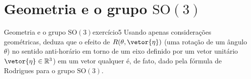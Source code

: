 \section[Geometria e o grupo SO(3)]{Geometria e o grupo \(\mathrm{SO}(3)\)}
\begin{exercício}{Geometria e o grupo \(\mathrm{SO}(3)\)}{exercício5}
    Usando apenas considerações geométricas, deduza que o efeito de \(R(\theta, \vetor{\eta})\) (uma rotação de um ângulo \(\theta\)) no sentido anti-horário em torno de um eixo definido por um vetor unitário \(\vetor{\eta} \in \mathbb{R}^3\)) em um vetor qualquer é, de fato, dado pela fórmula de Rodrigues para o grupo \(\mathrm{SO}(3)\).
\end{exercício}
